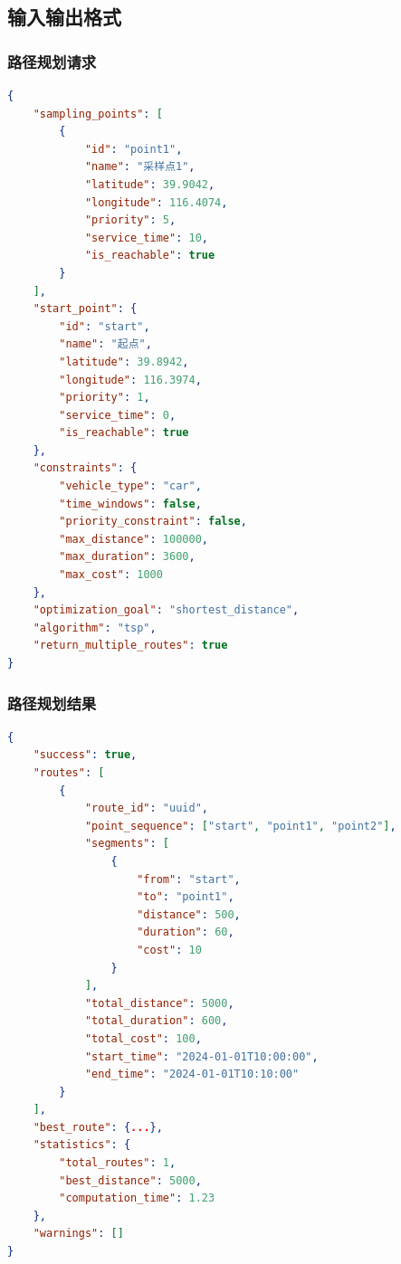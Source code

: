 \documentclass[12pt,a4paper,openany]{report}
\begin{document}
\subsection{输入输出格式}

\subsubsection{路径规划请求}

\begin{lstlisting}[language=JSON, caption=路径规划请求]
{
    "sampling_points": [
        {
            "id": "point1",
            "name": "采样点1",
            "latitude": 39.9042,
            "longitude": 116.4074,
            "priority": 5,
            "service_time": 10,
            "is_reachable": true
        }
    ],
    "start_point": {
        "id": "start",
        "name": "起点",
        "latitude": 39.8942,
        "longitude": 116.3974,
        "priority": 1,
        "service_time": 0,
        "is_reachable": true
    },
    "constraints": {
        "vehicle_type": "car",
        "time_windows": false,
        "priority_constraint": false,
        "max_distance": 100000,
        "max_duration": 3600,
        "max_cost": 1000
    },
    "optimization_goal": "shortest_distance",
    "algorithm": "tsp",
    "return_multiple_routes": true
}
\end{lstlisting}

\subsubsection{路径规划结果}

\begin{lstlisting}[language=JSON, caption=路径规划结果]
{
    "success": true,
    "routes": [
        {
            "route_id": "uuid",
            "point_sequence": ["start", "point1", "point2"],
            "segments": [
                {
                    "from": "start",
                    "to": "point1",
                    "distance": 500,
                    "duration": 60,
                    "cost": 10
                }
            ],
            "total_distance": 5000,
            "total_duration": 600,
            "total_cost": 100,
            "start_time": "2024-01-01T10:00:00",
            "end_time": "2024-01-01T10:10:00"
        }
    ],
    "best_route": {...},
    "statistics": {
        "total_routes": 1,
        "best_distance": 5000,
        "computation_time": 1.23
    },
    "warnings": []
}
\end{lstlisting}
\end{document}
